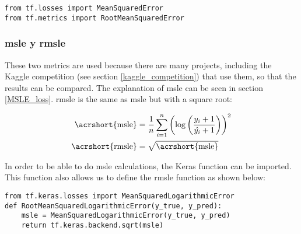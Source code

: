 \begin{verbatim}
from tf.losses import MeanSquaredError
from tf.metrics import RootMeanSquaredError
\end{verbatim}

\subsubsection{\acrshort{msle} y \acrshort{rmsle}}

These two metrics are used because there are many projects, including the Kaggle competition (see section \ref{kaggle_competition}) that use them, so that the results can be compared. The explanation of \acrshort{msle} can be seen in section \ref{MSLE_loss}. \acrshort{rmsle} is the same as \acrshort{msle} but with a square root:

\begin{equation}
\centering
    \begin{split}
        \text{\acrshort{msle}} &= \frac{1}{n} \sum_{i=1}^n \left(\log{\left(\frac{y_i + 1}{\hat{y_i} + 1}\right)}\right)^2 \\
        \text{\acrshort{rmsle}} &= \sqrt{\text{\acrshort{msle}}}
    \end{split}
\end{equation}

In order to be able to do \acrshort{msle} calculations, the Keras function can be imported. This function also allows us to define the \acrshort{rmsle} function as shown below:


\begin{verbatim}
from tf.keras.losses import MeanSquaredLogarithmicError
def RootMeanSquaredLogarithmicError(y_true, y_pred):
    msle = MeanSquaredLogarithmicError(y_true, y_pred)
    return tf.keras.backend.sqrt(msle)
\end{verbatim}